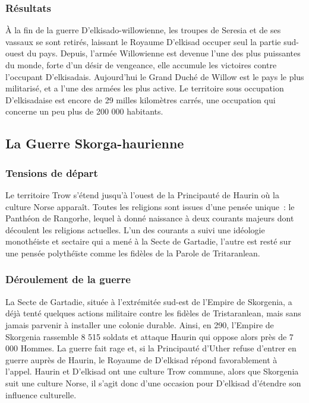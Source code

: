 \documentclass[french, a4paper, 12pt]{article}
\begin{document}
		\subsubsection{Résultats}

		À la fin de la guerre D'elkisado-willowienne, les troupes de Seresia et de ses vassaux se sont retirés, laissant le Royaume D'elkisad occuper seul la partie sud-ouest du pays. Depuis, l'armée Willowienne est devenue l'une des plus puissantes du monde, forte d'un désir de vengeance, elle accumule les victoires contre l'occupant D'elkisadais. Aujourd'hui le Grand Duché de Willow est le pays le plus militarisé, et a l'une des armées les plus active. Le territoire sous occupation D'elkisadaise est encore de 29 milles kilomètres carrés, une occupation qui concerne un peu plus de 200 000 habitants.

	\subsection{La Guerre Skorga-haurienne}

		\subsubsection{Tensions de départ}

		Le territoire Trow s'étend jusqu'à l'ouest de la Principauté de Haurin où la culture Norse apparaît. 
		Toutes les religions sont issues d'une pensée unique~: le Panthéon de Rangorhe, lequel à donné naissance à deux courants majeurs dont découlent les religions actuelles. L'un des courants a suivi une idéologie monothéiste et sectaire qui a mené à la Secte de Gartadie, l'autre est resté sur une pensée polythéïste comme les fidèles de la Parole de Tritaranlean.

		\subsubsection{Déroulement de la guerre}

		La Secte de Gartadie, située à l'extrémitée sud-est de l'Empire de Skorgenia, a déjà tenté quelques actions militaire contre les fidèles de Tristaranlean, mais sans jamais parvenir à installer une colonie durable. Ainsi, en 290, l'Empire de Skorgenia rassemble 8 515 soldats et attaque Haurin qui oppose alors près de 7 000 Hommes. La guerre fait rage et, si la Principauté d'Uther refuse d'entrer en guerre auprès de Haurin, le Royaume de D'elkisad répond favorablement à l'appel. Haurin et D'elkisad ont une culture Trow commune, alors que Skorgenia suit une culture Norse, il s'agit donc d'une occasion pour D'elkisad d'étendre son influence culturelle.
\end{document}
